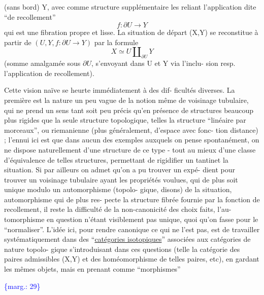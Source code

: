 \documentclass[11pt]{article}
\newcommand{\scanpage}[1]{\par\bigskip\noindent{\small\sffamily[scan #1]}\par}
\newcommand{\mspage}[1]{{\small\sffamily[p.\,#1]}}
\newcommand{\margin}[1]{\textcolor{blue}{\{\textsf{marg.:} #1\}}}
\newcommand{\uline}[1]{\underline{#1}}
\begin{document}
(sans bord)  Y, avec comme structure supplémentaire les reliant
l'application dite ``de recollement''
\[ f : \partial U \longrightarrow Y \]
qui est une fibration propre et lisse. La situation de départ
(X,Y)  se reconstitue à partir de  $(U,Y, f : \partial U \longrightarrow Y)$  par la
formule
\[ X \simeq U \amalg_{\partial U} Y \]
(somme amalgamée sous  $\partial U$, s'envoyant dans  U  et  Y  via l'inclu-%
sion resp. l'application de recollement).

Cette vision naïve se heurte immédiatement à des dif-%
ficultés diverses. La première est la nature un peu vague de la
notion même de voisinage tubulaire, qui ne prend un sens tant soit
peu précis qu'en présence de structures beaucoup plus rigides que
la seule structure topologique, telles la structure ``linéaire par
morceaux'', ou riemanienne (plus généralement, d'espace avec fonc-%
tion distance) ; l'ennui ici est que dans aucun des exemples
auxquels on pense spontanément, on ne dispose naturellement d'une
structure de ce type - tout au mieux d'une classe d'équivalence
de telles structures, permettant de rigidifier un tantinet la
situation. Si par ailleurs on admet qu'on a pu trouver un expé-%
dient pour trouver un voisinage tubulaire ayant les propriétés
voulues, qui de plus soit unique modulo un automorphisme (topolo-%
gique, disons) de la situation, automorphisme qui de plus res-%
pecte la structure fibrée fournie par la fonction de recollement,
il reste la difficulté de la non-canonicité des choix faits, l'au-%
tomorphisme en question n'étant visiblement pas unique, quoi qu'on
fasse pour le ``normaliser''. L'idée ici, pour rendre canonique ce
qui ne l'est pas, est de travailler systématiquement dans des
``\uline{catégories isotopiques}'' associées aux catégories de nature topolo-%
gique s'introduisant dans ces questions (telle la catégorie des
paires admissibles  (X,Y)  et des homéomorphisme de telles paires,
etc), en gardant les mêmes objets, mais en prenant comme ``morphismes''

\margin{29}

\clearpage
\scanpage{119/30}
\mspage{28}
\end{document}
